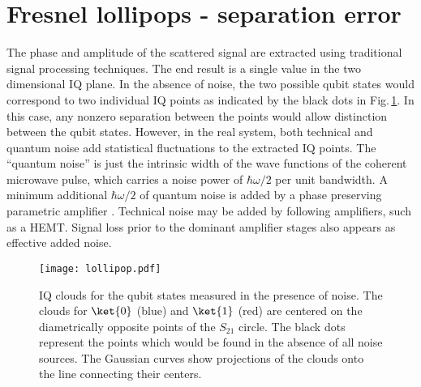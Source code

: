 \section{Fresnel lollipops - separation error}

The phase and amplitude of the scattered signal are extracted using traditional signal processing techniques.
The end result is a single value in the two dimensional IQ plane.
In the absence of noise, the two possible qubit states would correspond to two individual IQ points as indicated by the black dots in Fig.\,\ref{Fig:lollipop}.
In this case, any nonzero separation between the points would allow distinction between the qubit states.
However, in the real system, both technical and quantum noise add statistical fluctuations to the extracted IQ points.
The ``quantum noise'' is just the intrinsic width of the wave functions of the coherent microwave pulse, which carries a noise power of $\hbar \omega / 2$ per unit bandwidth.
A minimum additional $\hbar \omega / 2$ of quantum noise is added by a phase preserving parametric amplifier \cite{Caves:amplifiers1982}.
Technical noise may be added by following amplifiers, such as a HEMT.
Signal loss prior to the dominant amplifier stages also appears as effective added noise.

\begin{figure}
\begin{centering}
\texttt{[image: lollipop.pdf]} 
\par\end{centering}
\caption{IQ clouds for the qubit states measured in the presence of noise. The clouds for $\ket{0}$ (blue) and $\ket{1}$ (red) are centered on the diametrically opposite points of the $S_{21}$ circle. The black dots represent the points which would be found in the absence of all noise sources. The Gaussian curves show projections of the clouds onto the line connecting their centers.}
\label{Fig:lollipop}
\end{figure}

